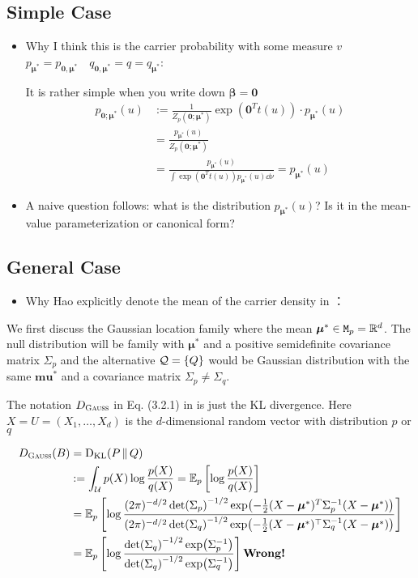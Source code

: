 \subsection{Simple Case}
\begin{itemize}
    \item Why I think this is the carrier probability with some measure $v$ $p_{\bm{\mu}^*} = p_{\bm{0}, \bm{\mu}^*} \quad q_{\bm{0},\bm{\mu}^*} = q = q_{\bm{\mu}^*}$:

    It is rather simple when you write down $\bm{\beta}=\bm{0}$
    \begin{align*}
        p_{\bm{0};\bm{\mu}^*}(u) &:= 
            \frac{1}{Z_p(\bm{0};\bm{\mu}^*)}\exp(\bm{0}^T t(u))\cdot p_{\bm{\mu}^*}(u) \\
            &= \frac{p_{\bm{\mu}^*}(u)}{Z_p(\bm{0};\bm{\mu}^*)} \\
            &= \frac{p_{\bm{\mu}^*}(u)}{\int\exp(\bm{0}^T t(u)) p_{\bm{\mu}^*}(u)\dd{\nu}} 
            = p_{\bm{\mu}^*}(u)
    \end{align*}

    \item A naive question follows: what is the distribution $p_{\bm{\mu}^*}(u)$? 
    Is it in the mean-value parameterization or canonical form?
\end{itemize}

\subsection{General Case}

\begin{itemize}
    \item Why Hao explicitly denote the mean of the carrier density in \cite{grunwaldSafeTesting2024}：
\end{itemize}

We first discuss the Gaussian location family where the mean $\bm{\mu}^*\in\mathtt{M}_p=\mathbb{R}^d$.
The null distribution will be family with $\bm{\mu}^*$ and a positive semidefinite covariance matrix $\Sigma_p$
and the alternative $\mathcal{Q}=\{Q\}$ would be Gaussian distribution with the same $\bm{mu}^*$ and 
a covariance matrix $\Sigma_p \not= \Sigma_q$.

The notation $D_{\textsc{Gauss}}$ in Eq. (3.2.1) in \cite{haoEvaluesAnytimevalidInference2025} is 
just the KL divergence. Here $X=U=(X_1,\dots,X_d)$ is the $d$-dimensional random vector with
distribution $p$ or $q$

\begin{align*}
    D_{\textsc{Gauss}}(B) &= \KL{P}{Q} \\
    &:= \int_{\Uc} p(X) \log \frac{p(X)}{q(X)}
    = \ERWi{p}{\log\frac{p(X)}{q(X)}} \\
    &= \ERWi{p}{\log\frac{(2\pi)^{-d/2} \det(\Sigma_p)^{-1/2}\exp(-\frac{1}{2}(X-\bm{\mu}^*)^T \Sigma_p^{-1}(X-\bm{\mu}^*))}
    {(2\pi)^{-d/2} \det(\Sigma_q)^{-1/2}\exp(-\frac{1}{2}(X-\bm{\mu}^*)^\top \Sigma_q^{-1}(X-\bm{\mu}^*))}} \\
    &= \ERWi{p}{\log\frac{\det(\Sigma_q)^{-1/2} \exp(\Sigma_p^{-1})}{\det(\Sigma_q)^{-1/2}\exp(\Sigma_q^{-1})}} \qq{Wrong!}
\end{align*}

